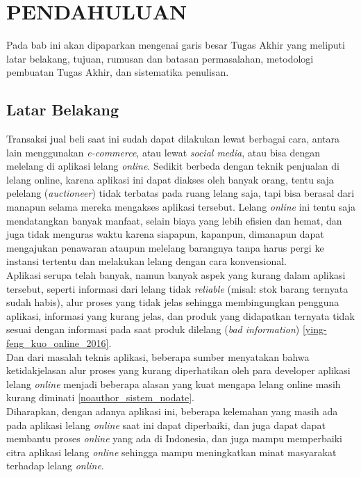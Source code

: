\chapter{PENDAHULUAN}
  Pada bab ini akan dipaparkan mengenai garis besar Tugas Akhir yang meliputi latar belakang, tujuan, rumusan dan batasan permasalahan, metodologi pembuatan Tugas Akhir, dan sistematika penulisan.
  
  \section{Latar Belakang}	
	\indent Transaksi jual beli saat ini sudah dapat dilakukan lewat berbagai cara, antara lain menggunakan \textit{e-commerce}, atau lewat \textit{social media}, atau bisa dengan melelang di aplikasi lelang \textit{online}. Sedikit berbeda dengan teknik penjualan di lelang online, karena aplikasi ini dapat diakses oleh banyak orang, tentu saja pelelang (\textit{auctioneer}) tidak terbatas pada ruang lelang saja, tapi bisa berasal dari manapun selama mereka mengakses aplikasi tersebut.  Lelang \textit{online} ini tentu saja mendatangkan banyak manfaat, selain biaya yang lebih efisien dan hemat, dan juga tidak menguras waktu karena siapapun, kapanpun, dimanapun dapat mengajukan penawaran ataupun melelang barangnya tanpa harus pergi ke instansi tertentu dan melakukan lelang dengan cara konvensional.
    \\
    \indent Aplikasi serupa telah banyak, namun banyak aspek yang kurang dalam aplikasi tersebut, seperti informasi dari lelang tidak \textit{reliable} (misal: stok barang ternyata sudah habis), alur proses yang tidak jelas sehingga membingungkan pengguna aplikasi, informasi yang kurang jelas, dan produk yang didapatkan ternyata tidak sesuai dengan informasi pada saat produk dilelang (\textit{bad information}) \ref{ying-feng_kuo_online_2016}.
    \\
    \indent Dan dari masalah teknis aplikasi, beberapa sumber menyatakan bahwa ketidakjelasan alur proses yang kurang diperhatikan oleh para developer aplikasi lelang \textit{online} menjadi beberapa alasan yang kuat mengapa lelang online masih kurang diminati \ref{noauthor_sistem_nodate}.
    \\
	\indent Diharapkan, dengan adanya aplikasi ini, beberapa kelemahan yang masih ada pada aplikasi lelang \textit{online} saat ini dapat diperbaiki, dan juga dapat dapat membantu proses \textit{online} yang ada di Indonesia, dan juga mampu memperbaiki citra aplikasi lelang \textit{online} sehingga mampu meningkatkan minat masyarakat terhadap lelang \textit{online}.
    
